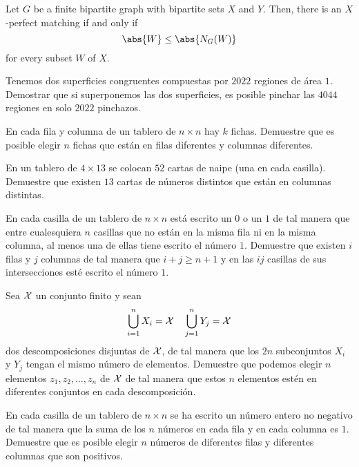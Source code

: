 \note[Combinatoria]{}

\begin{theorem}
	Let $G$ be a finite bipartite graph with bipartite sets $X$ and $Y$. Then, there is an $X$-perfect matching if and only if
	\[\abs{W}\le\abs{N_G(W)}\]
	for every subset $W$ of $X$.
\end{theorem}

\begin{probEG}
	Tenemos dos superficies congruentes compuestas por $2022$ regiones de área $1$. Demostrar que si superponemos las dos superficies, es posible pinchar las $4044$ regiones en solo $2022$ pinchazos.
\end{probEG}

\begin{probEG}
	En cada fila y columna de un tablero de $n\times n$ hay $k$ fichas. Demuestre que es posible elegir $n$ fichas que están en filas diferentes y columnas diferentes.
\end{probEG}

\begin{probEG}
	En un tablero de $4\times 13$ se colocan $52$ cartas de naipe (una en cada casilla). Demuestre que existen $13$ cartas de números distintos que están en columnas distintas.
\end{probEG}

\begin{probEB}
	En cada casilla de un tablero de $n\times n$ está escrito un $0$ o un $1$ de tal manera que entre cualesquiera $n$ casillas que no están en la misma fila ni en la misma columna, al menos una de ellas tiene escrito el número $1$. Demuestre que existen $i$ filas y $j$ columnas de tal manera que $i+j\ge n+1$ y en las $ij$ casillas de sus intersecciones esté escrito el número $1$.
\end{probEB}

\begin{probEG}
	Sea $\cal X$ un conjunto finito y sean
	\[\bigcup_{i=1}^n X_i={\cal X}\quad\bigcup_{j=1}^n Y_j={\cal X}\]
	dos descomposiciones disjuntas de $\cal X$, de tal manera que los $2n$ subconjuntos $X_i$ y $Y_j$ tengan el mismo número de elementos. Demuestre que podemos elegir $n$ elementos $z_1,z_2,\dots,z_n$ de $\cal X$ de tal manera que estos $n$ elementos estén en diferentes conjuntos en cada descomposición.
\end{probEG}

\begin{probEG}
	En cada casilla de un tablero de $n\times n$ se ha escrito un número entero no negativo de tal manera que la suma de los $n$ números en cada fila y en cada columna es $1$. Demuestre que es posible elegir $n$ números de diferentes filas y diferentes columnas que son positivos.
\end{probEG}

